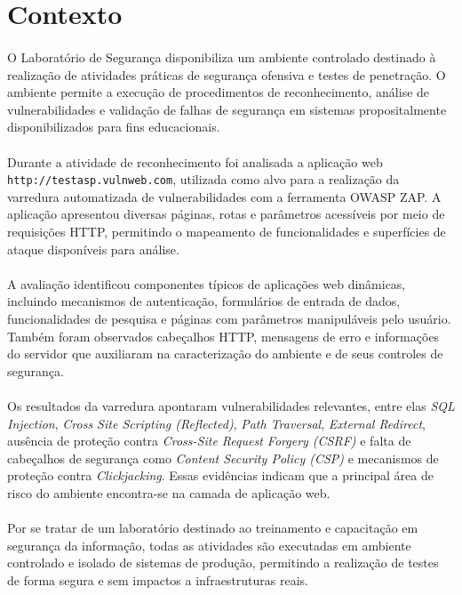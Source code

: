 \section{Contexto}

\paragraph{}
O Laboratório de Segurança disponibiliza um ambiente controlado destinado à
realização de atividades práticas de segurança ofensiva e testes de penetração.
O ambiente permite a execução de procedimentos de reconhecimento, análise de
vulnerabilidades e validação de falhas de segurança em sistemas propositalmente
disponibilizados para fins educacionais.

\paragraph{}
Durante a atividade de reconhecimento foi analisada a aplicação web
\texttt{http://testasp.vulnweb.com}, utilizada como alvo para a realização da
varredura automatizada de vulnerabilidades com a ferramenta OWASP ZAP. A
aplicação apresentou diversas páginas, rotas e parâmetros acessíveis por meio
de requisições HTTP, permitindo o mapeamento de funcionalidades e superfícies
de ataque disponíveis para análise.

\paragraph{}
A avaliação identificou componentes típicos de aplicações web dinâmicas,
incluindo mecanismos de autenticação, formulários de entrada de dados,
funcionalidades de pesquisa e páginas com parâmetros manipuláveis pelo usuário.
Também foram observados cabeçalhos HTTP, mensagens de erro e informações do
servidor que auxiliaram na caracterização do ambiente e de seus controles de
segurança.

\paragraph{}
Os resultados da varredura apontaram vulnerabilidades relevantes, entre elas
\textit{SQL Injection}, \textit{Cross Site Scripting (Reflected)}, \textit{Path
Traversal}, \textit{External Redirect}, ausência de proteção contra
\textit{Cross-Site Request Forgery (CSRF)} e falta de cabeçalhos de segurança
como \textit{Content Security Policy (CSP)} e mecanismos de proteção contra
\textit{Clickjacking}. Essas evidências indicam que a principal área de risco
do ambiente encontra-se na camada de aplicação web.

\paragraph{}
Por se tratar de um laboratório destinado ao treinamento e capacitação em
segurança da informação, todas as atividades são executadas em ambiente
controlado e isolado de sistemas de produção, permitindo a realização de testes
de forma segura e sem impactos a infraestruturas reais.
